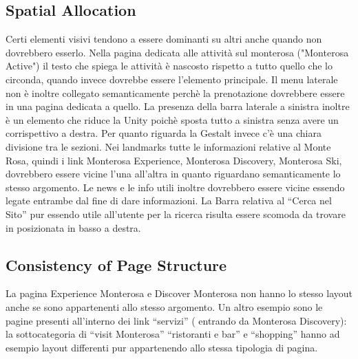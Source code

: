         \subsection{Spatial Allocation}
        Certi elementi visivi tendono a essere dominanti su altri anche quando
        non dovrebbero esserlo. Nella pagina dedicata alle attività sul
        monterosa ("Monterosa Active") il testo che spiega le
        attività è nascosto rispetto a tutto quello che lo circonda, quando
        invece dovrebbe essere l’elemento principale. Il menu laterale non è
        inoltre collegato semanticamente perchè la prenotazione dovrebbere
        essere in una pagina dedicata a quello.
        La presenza della barra laterale a sinistra inoltre è un elemento che
        riduce la Unity poichè sposta tutto a sinistra senza avere un
        corrispettivo a destra. Per quanto riguarda la Gestalt invece c’è una
        chiara divisione tra le sezioni. Nei landmarks tutte le informazioni
        relative al Monte Rosa, quindi i link Monterosa Experience, Monterosa
        Discovery, Monterosa Ski, dovrebbero essere vicine l'una all'altra in quanto
        riguardano semanticamente lo stesso argomento. Le news e le info utili
        inoltre dovrebbero essere vicine essendo legate entrambe dal fine di
        dare informazioni. La Barra relativa al “Cerca nel Sito” pur essendo
        utile all'utente per la ricerca risulta essere scomoda da trovare in
        posizionata in basso a destra.
        \subsection{Consistency of Page Structure}
        La pagina Experience Monterosa e Discover Monterosa non hanno lo stesso
        layout anche se sono appartenenti allo stesso argomento. Un altro
        esempio sono le pagine presenti all'interno  dei link “servizi” (
        entrando da Monterosa Discovery): la sottocategoria di “visit Monterosa”
        “ristoranti e bar” e  “shopping” hanno ad esempio layout differenti pur
        appartenendo allo stessa tipologia di pagina.
        


        